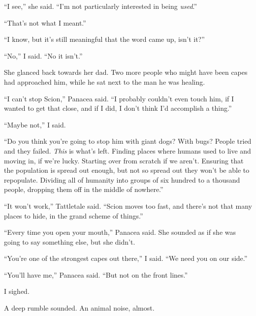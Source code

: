 ``I see,'' she said.  ``I'm not particularly interested in being \emph{used}.''



``That's not what I meant.''



``I know, but it's still meaningful that the word came up, isn't it?''



``No,'' I said.  ``No it isn't.''



She glanced back towards her dad.  Two more people who might have been capes had approached him, while he sat next to the man he was healing.



``I can't stop Scion,'' Panacea said.  ``I probably couldn't even touch him, if I wanted to get that close, and if I did, I don't think I'd accomplish a thing.''



``Maybe not,'' I said.



``Do you think you're going to stop him with giant dogs?  With bugs?  People tried and they failed.  \emph{This} is what's left.  Finding places where humans used to live and moving in, if we're lucky.  Starting over from scratch if we aren't.  Ensuring that the population is spread out enough, but not so spread out they won't be able to repopulate.  Dividing all of humanity into groups of six hundred to a thousand people, dropping them off in the middle of nowhere.''



``It won't work,'' Tattletale said.  ``Scion moves too fast, and there's not that many places to hide, in the grand scheme of things.''



``Every time you open your mouth,'' Panacea said.  She sounded as if she was going to say something else, but she didn't.



``You're one of the strongest capes out there,'' I said.  ``We need you on our side.''



``You'll have me,'' Panacea said.  ``But not on the front lines.''



I sighed.



A deep rumble sounded.  An animal noise, almost.



